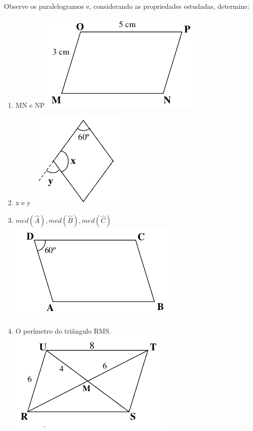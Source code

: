 				\item Observe os paralelogramos e, considerando as propriedades estudadas, determine:
				\begin{multicols}{2}
				\begin{enumerate}
					\item MN e NP 
					\includegraphics[scale=0.7]{figuras/fig30.png}
					\item x e y 
					\includegraphics[scale=0.7]{figuras/fig31.png}
					\item $med(\widehat{A}),med(\widehat{B}),med(\widehat{C})$\\
					\includegraphics[scale=0.7]{figuras/fig32.png}
					\item O perímetro do triângulo RMS.
					\includegraphics[scale=0.7]{figuras/fig33.png}
				\end{enumerate}
				\end{multicols}
				
